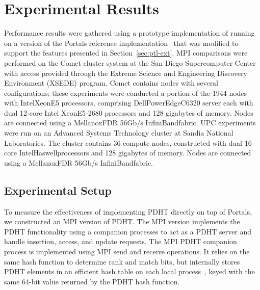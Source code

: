 \section{Experimental Results}




Performance results were gathered using a prototype implementation of \pdht
running on a version of the Portals reference implementation~\cite{portals-code}
that was modified to support the features presented in
Section~\ref{sec:ptl-ext}. MPI comparisons were performed on the Comet cluster
system at the San Diego Supercomputer Center with access provided through the
Extreme Science and Engineering Discovery Environment (XSEDE) program. Comet
contains nodes with several configurations; these experiments were conducted a
portion of the 1944 nodes with Intel\regtm Xeon\regtm E5 processors, comprising
Dell\othertm PowerEdge\othertm C6320 server each with dual 12-core Intel\regtm
Xeon\regtm E5-2680 processors and 128 gigabytes of memory. Nodes are connected
using a Mellanox\othertm FDR 56Gb/s InfiniBand\othertm fabric. UPC experiments
were run on an Advanced Systems Technology cluster at Sandia National
Laboratories.  The cluster contains 36 compute nodes, constructed with dual
16-core Intel\regtm Haswell\regtm processors and 128 gigabytes of memory. Nodes
are connected using a Mellanox\othertm FDR 56Gb/s InfiniBand\othertm fabric.


\subsection{Experimental Setup}

To measure the effectiveness of implementing PDHT directly on top of Portals,
we constructed an MPI version of PDHT. The MPI version implements the PDHT
functionality using a companion processes to act as a PDHT server and handle
insertion, access, and update requests.  The MPI PDHT companion process is
implemented using MPI send and receive operations.  It relies on the same hash
function to determine rank and match bits, but internally stores PDHT elements
in an efficient hash table on each local process~\cite{uthash}, keyed with the
same 64-bit value returned by the PDHT hash function. 

